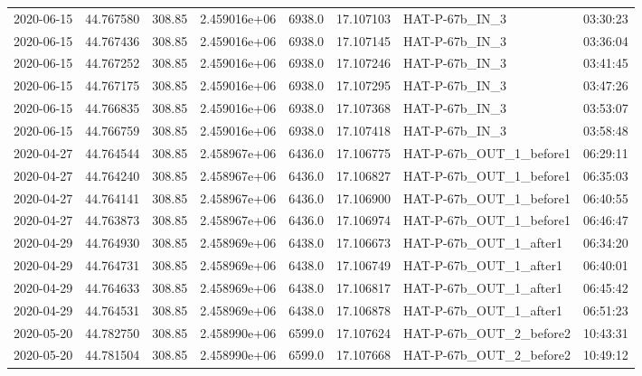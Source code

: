 \documentclass{aastex631}
\begin{document}
\begin{tabular}{lrrrlrll}
    2020-06-15 & 44.767580   & 308.85        & 2.459016e+06 & 6938.0 & 17.107103 & HAT-P-67b\_IN\_3           & 03:30:23 \\
    2020-06-15 & 44.767436   & 308.85        & 2.459016e+06 & 6938.0 & 17.107145 & HAT-P-67b\_IN\_3           & 03:36:04 \\
    2020-06-15 & 44.767252   & 308.85        & 2.459016e+06 & 6938.0 & 17.107246 & HAT-P-67b\_IN\_3           & 03:41:45 \\
    2020-06-15 & 44.767175   & 308.85        & 2.459016e+06 & 6938.0 & 17.107295 & HAT-P-67b\_IN\_3           & 03:47:26 \\
    2020-06-15 & 44.766835   & 308.85        & 2.459016e+06 & 6938.0 & 17.107368 & HAT-P-67b\_IN\_3           & 03:53:07 \\
    2020-06-15 & 44.766759   & 308.85        & 2.459016e+06 & 6938.0 & 17.107418 & HAT-P-67b\_IN\_3           & 03:58:48 \\
    2020-04-27 & 44.764544   & 308.85        & 2.458967e+06 & 6436.0 & 17.106775 & HAT-P-67b\_OUT\_1\_before1 & 06:29:11 \\
    2020-04-27 & 44.764240   & 308.85        & 2.458967e+06 & 6436.0 & 17.106827 & HAT-P-67b\_OUT\_1\_before1 & 06:35:03 \\
    2020-04-27 & 44.764141   & 308.85        & 2.458967e+06 & 6436.0 & 17.106900 & HAT-P-67b\_OUT\_1\_before1 & 06:40:55 \\
    2020-04-27 & 44.763873   & 308.85        & 2.458967e+06 & 6436.0 & 17.106974 & HAT-P-67b\_OUT\_1\_before1 & 06:46:47 \\
    2020-04-29 & 44.764930   & 308.85        & 2.458969e+06 & 6438.0 & 17.106673 & HAT-P-67b\_OUT\_1\_after1  & 06:34:20 \\
    2020-04-29 & 44.764731   & 308.85        & 2.458969e+06 & 6438.0 & 17.106749 & HAT-P-67b\_OUT\_1\_after1  & 06:40:01 \\
    2020-04-29 & 44.764633   & 308.85        & 2.458969e+06 & 6438.0 & 17.106817 & HAT-P-67b\_OUT\_1\_after1  & 06:45:42 \\
    2020-04-29 & 44.764531   & 308.85        & 2.458969e+06 & 6438.0 & 17.106878 & HAT-P-67b\_OUT\_1\_after1  & 06:51:23 \\
    2020-05-20 & 44.782750   & 308.85        & 2.458990e+06 & 6599.0 & 17.107624 & HAT-P-67b\_OUT\_2\_before2 & 10:43:31 \\
    2020-05-20 & 44.781504   & 308.85        & 2.458990e+06 & 6599.0 & 17.107668 & HAT-P-67b\_OUT\_2\_before2 & 10:49:12 \\

\end{tabular}
\end{document}
